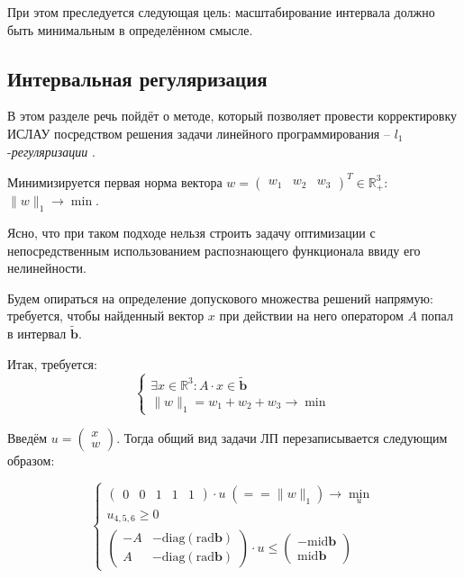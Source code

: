 При этом преследуется следующая цель: масштабирование интервала должно быть минимальным в определённом смысле.

\subsection{Интервальная регуляризация}

В этом разделе речь пойдёт о методе, который позволяет провести корректировку ИСЛАУ посредством решения задачи линейного программирования -- $l_1$-\textit{регуляризации} \cite{intv}.

Минимизируется первая норма вектора 
$w = 
\begin{pmatrix}
w_1 & w_2 & w_3
\end{pmatrix}^T \in \mathbb{R}_+^3$: $\|w\|_1 \rightarrow \min$.

Ясно, что при таком подходе нельзя строить задачу оптимизации с непосредственным использованием распознающего функционала ввиду его нелинейности. 

Будем опираться на определение допускового множества решений напрямую: требуется, чтобы найденный вектор $x$ при действии на него оператором $A$ попал в интервал $\tilde{\mathbf{b}}$.

Итак, требуется:
\begin{equation}
\begin{cases}
	\exists x \in \mathbb{R}^3: A \cdot x \in \tilde{\mathbf{b}} \\
	\|w\|_1 = w_1 + w_2 + w_3 \rightarrow \min
\end{cases}
\end{equation}

Введём 
$u=
\begin{pmatrix}
x \\ w
\end{pmatrix}$.
Тогда общий вид задачи ЛП перезаписывается следующим образом: 

\begin{equation}
\begin{cases}
\begin{pmatrix}
0 & 0 & 1 & 1 & 1
\end{pmatrix} \cdot u \; (== \|w\|_1) \rightarrow \underset{u}{\min} \\
u_{4,5,6} \geq 0 \\
\begin{pmatrix}
-A & -\textrm{diag}(\textrm{rad} \mathbf{b}) \\
 A & -\textrm{diag}(\textrm{rad} \mathbf{b})
\end{pmatrix}
\cdot
u
\leq 
\begin{pmatrix}
-\textrm{mid} \mathbf{b} \\
\textrm{mid} \mathbf{b}
\end{pmatrix}
\end{cases}
\end{equation}

